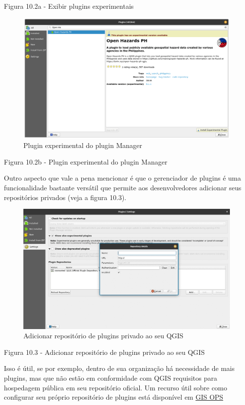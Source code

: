 \documentclass[
]{krantz}
\begin{document}
Figura 10.2a - Exibir plugins experimentais

\begin{figure}
\centering
\includegraphics{media/modulo10/fig102_b.png}
\caption{Plugin experimental do plugin Manager}
\end{figure}

Figura 10.2b - Plugin experimental do plugin Manager

Outro aspecto que vale a pena mencionar é que o gerenciador de plugins é uma funcionalidade bastante versátil que permite aos desenvolvedores adicionar seus repositórios privados (veja a figura 10.3).

\begin{figure}
\centering
\includegraphics{media/modulo10/fig103.png}
\caption{Adicionar repositório de plugins privado ao seu QGIS}
\end{figure}

Figura 10.3 - Adicionar repositório de plugins privado ao seu QGIS

Isso é útil, se por exemplo, dentro de sua organização há necessidade de mais plugins, mas que não estão em conformidade com QGIS requisitos para hospedagem pública em seu repositório oficial. Um recurso útil sobre como configurar seu próprio repositório de plugins está disponível em \href{https://gis-ops.com/qgis-3-plugin-tutorial-set-up-a-plugin-repository-explained/}{GIS OPS}
\end{document}
